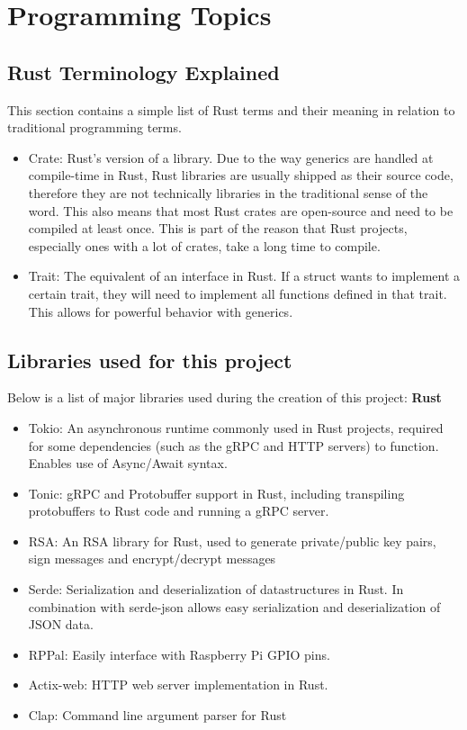 \chapter{Programming Topics}

\section{Rust Terminology Explained} \label{cha3:rustterms}
This section contains a simple list of Rust terms and their meaning in relation to traditional programming terms.
\begin{itemize}
    \item Crate: Rust's version of a library. Due to the way generics are handled at compile-time in Rust, Rust libraries are usually shipped as their source code, therefore they are not technically libraries in the traditional sense of the word. This also means that most Rust crates are open-source and need to be compiled at least once. This is part of the reason that Rust projects, especially ones with a lot of crates, take a long time to compile.
    \item Trait: The equivalent of an interface in Rust. If a struct wants to implement a certain trait, they will need to implement all functions defined in that trait. This allows for powerful behavior with generics.
\end{itemize}

\section{Libraries used for this project}
Below is a list of major libraries used during the creation of this project:
\center \textbf{Rust}
\begin{itemize}
    \item Tokio: An asynchronous runtime commonly used in Rust projects, required for some dependencies (such as the gRPC and HTTP servers) to function. Enables use of Async/Await syntax.
    \item Tonic: gRPC and Protobuffer support in Rust, including transpiling protobuffers to Rust code and running a gRPC server.
    \item RSA: An RSA library for Rust, used to generate private/public key pairs, sign messages and encrypt/decrypt messages
    \item Serde: Serialization and deserialization of datastructures in Rust. In combination with serde-json allows easy serialization and deserialization of JSON data.
    \item RPPal: Easily interface with Raspberry Pi GPIO pins.
    \item Actix-web: HTTP web server implementation in Rust.
    \item Clap: Command line argument parser for Rust
\end{itemize}

